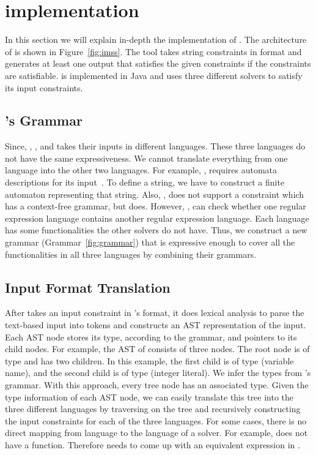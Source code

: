 \section{implementation}
\label{sec:implementation}
In this section we will explain in-depth the implementation of \imss.
The architecture of \imss is shown
in Figure~\ref{fig:imss}. The tool takes string constraints in \imss format
and generates at least one output that satisfies the given constraints if the constraints are satisfiable.
\imss is implemented in Java and uses three different solvers to satisfy its input constraints.


\subsection{\imss's Grammar}
Since, \hampi, \dprle, and \zstr takes their inputs in
 different languages. These three languages do not have the same expressiveness.
 We cannot translate everything from one language into the other two languages. For example,
 \dprle, requires automata descriptions for its input~\cite{lazystrings2010}.
 To define a string, we have to construct a finite automaton representing that string.
 Also, \dprle, does not support a constraint which has a context-free grammar,
 but \hampi does. However, \dprle, can check whether one regular expression language
 contains another regular expression language. Each language has some functionalities the
 other solvers do not have. Thus, we construct a new grammar (Grammar~\ref{fig:grammar}) that is expressive enough to
 cover all the functionalities in all three languages by combining their grammars.

\subsection{Input Format Translation}
After \imss takes an input constraint in \imss's format, it does lexical analysis to parse
the text-based input into tokens and constructs an AST representation of the input.
Each AST node stores its type, according to the grammar, and pointers to its child nodes.
For example, the AST of  consists of three nodes. The root node is of type
 and has two children. In this example, the first child is of type  (variable name), and
the second child is of type  (integer literal). We infer the types from \imss's grammar.
With this approach, every tree node has an associated type. Given the type information of
each AST node, we can easily translate this tree into the three different languages by traversing
on the tree and recursively constructing the input constraints for each of the three languages.
For some cases, there is no direct mapping from \imss language to the language of
a solver.
For example, \dprle does not have a  function. Therefore \imss needs to come up with an equivalent
expression in \dprle.

